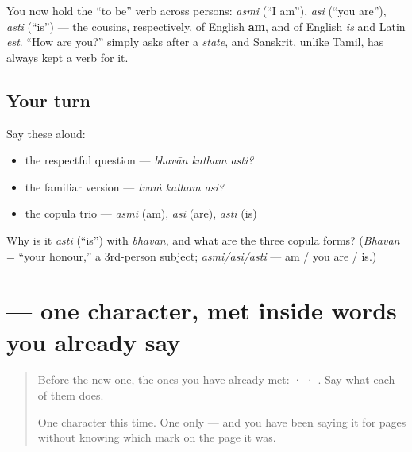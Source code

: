 \begin{grammarlens}[title={Grammar Lens: the copula, three persons}]
You now hold the \textquotedblleft{}to be\textquotedblright{} verb across persons: \emph{asmi} (\textquotedblleft{}I am\textquotedblright{}), \emph{asi} (\textquotedblleft{}you are\textquotedblright{}), \emph{asti} (\textquotedblleft{}is\textquotedblright{}) — the cousins, respectively, of English \textbf{am}, and of English \emph{is} and Latin \emph{est}. \textquotedblleft{}How are you?\textquotedblright{} simply asks after a \emph{state}, and Sanskrit, unlike Tamil, has always kept a verb for it.
\end{grammarlens}

\subsection*{Your turn}
Say these aloud:

\begin{itemize}
\raggedright
  \item the respectful question — \emph{bhavān katham asti?}
  \item the familiar version — \emph{tvaṁ katham asi?}
  \item the copula trio — \emph{asmi} (am), \emph{asi} (are), \emph{asti} (is)
\end{itemize}

\begin{tcolorbox}[breakable,colback=teal!4,colframe=teal!35!black,title={Before you move on}]
Why is it \emph{asti} (\textquotedblleft{}is\textquotedblright{}) with \emph{bhavān}, and what are the three copula forms? (\emph{Bhavān} = \textquotedblleft{}your honour,\textquotedblright{} a 3rd-person subject; \emph{asmi/asi/asti} — am / you are / is.)
\end{tcolorbox}
\section[\texorpdfstring{\sk{ा} (ā)}{ा (ā)}]{ — one character, met inside words you already say}

\label{lesson:SA-S06-vowel-sign-aa}



\begin{quote}
Before the new one, the ones you have already met:  ·  · . Say what each of them does.

One character this time. One only — and you have been saying it for pages without knowing which mark on the page it was.
\end{quote}


